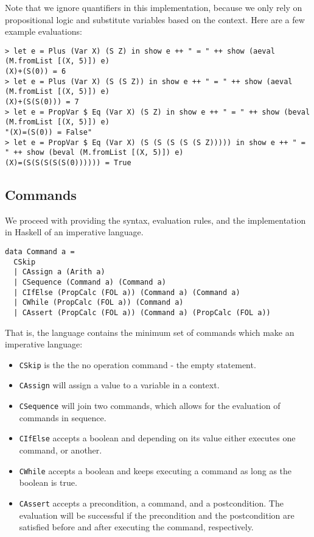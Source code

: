 \documentclass{article}
\begin{document}
Note that we ignore quantifiers in this implementation, because we only rely on propositional logic and substitute variables based on the context. Here are a few example evaluations:

\begin{lstlisting}
> let e = Plus (Var X) (S Z) in show e ++ " = " ++ show (aeval (M.fromList [(X, 5)]) e)
(X)+(S(0)) = 6
> let e = Plus (Var X) (S (S Z)) in show e ++ " = " ++ show (aeval (M.fromList [(X, 5)]) e)
(X)+(S(S(0))) = 7
> let e = PropVar $ Eq (Var X) (S Z) in show e ++ " = " ++ show (beval (M.fromList [(X, 5)]) e)
"(X)=(S(0)) = False"
> let e = PropVar $ Eq (Var X) (S (S (S (S (S Z))))) in show e ++ " = " ++ show (beval (M.fromList [(X, 5)]) e)
(X)=(S(S(S(S(S(0)))))) = True
\end{lstlisting}

\subsection{Commands}

We proceed with providing the syntax, evaluation rules, and the implementation in Haskell of an imperative language.

\begin{lstlisting}
data Command a =
  CSkip
  | CAssign a (Arith a)
  | CSequence (Command a) (Command a)
  | CIfElse (PropCalc (FOL a)) (Command a) (Command a)
  | CWhile (PropCalc (FOL a)) (Command a)
  | CAssert (PropCalc (FOL a)) (Command a) (PropCalc (FOL a))
\end{lstlisting}

That is, the language contains the minimum set of commands which make an imperative language:

\begin{itemize}
\item \texttt{CSkip} is the the no operation command - the empty statement.
\item \texttt{CAssign} will assign a value to a variable in a context.
\item \texttt{CSequence} will join two commands, which allows for the evaluation of commands in sequence.
\item \texttt{CIfElse} accepts a boolean and depending on its value either executes one command, or another.
\item \texttt{CWhile} accepts a boolean and keeps executing a command as long as the boolean is true.
\item \texttt{CAssert} accepts a precondition, a command, and a postcondition. The evaluation will be successful if the precondition and the postcondition are satisfied before and after executing the command, respectively.
\end{itemize}
\end{document}
